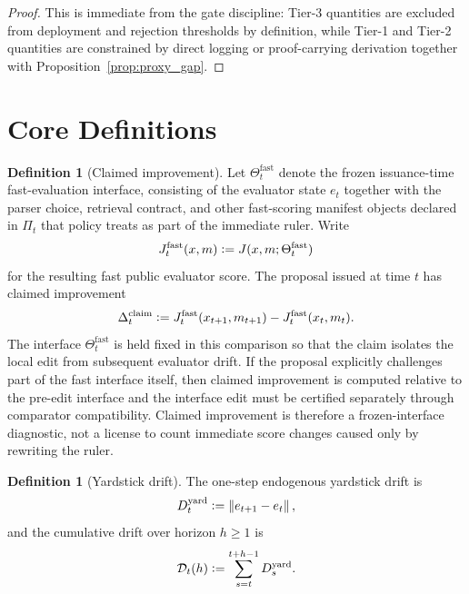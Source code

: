 \documentclass[11pt]{article}
\theoremstyle{definition}
\newtheorem{definition}[theorem]{Definition}
\newcommand{\1}{\mathbf{1}}
\newcommand{\norm}[1]{\left\lVert #1 \right\rVert}
\newcommand{\Defeq}{\vcentcolon=}
\begin{document}
\begin{proof}
This is immediate from the gate discipline: Tier-3 quantities are excluded from deployment and rejection thresholds by definition, while Tier-1 and Tier-2 quantities are constrained by direct logging or proof-carrying derivation together with Proposition~\ref{prop:proxy_gap}.
\end{proof}
\section{Core Definitions}
\begin{definition}[Claimed improvement]\label{def:claimed_improvement}
Let $\Theta_t^{\mathrm{fast}}$ denote the frozen issuance-time fast-evaluation interface, consisting of the evaluator state $e_t$ together with the parser choice, retrieval contract, and other fast-scoring manifest objects declared in $\Pi_t$ that policy treats as part of the immediate ruler. Write
\[
J_t^{\mathrm{fast}}(x,m)\Defeq J(x,m;\Theta_t^{\mathrm{fast}})
\]
for the resulting fast public evaluator score. The proposal issued at time $t$ has claimed improvement
\[
\Delta_t^{\mathrm{claim}}\Defeq J_t^{\mathrm{fast}}(x_{t+1},m_{t+1})-J_t^{\mathrm{fast}}(x_t,m_t).
\]
The interface $\Theta_t^{\mathrm{fast}}$ is held fixed in this comparison so that the claim isolates the local edit from subsequent evaluator drift. If the proposal explicitly challenges part of the fast interface itself, then claimed improvement is computed relative to the pre-edit interface and the interface edit must be certified separately through comparator compatibility. Claimed improvement is therefore a frozen-interface diagnostic, not a license to count immediate score changes caused only by rewriting the ruler.
\end{definition}

\begin{definition}[Yardstick drift]\label{def:yardstick_drift}
The one-step endogenous yardstick drift is
\[
D_t^{\mathrm{yard}}\Defeq \norm{e_{t+1}-e_t},
\]
and the cumulative drift over horizon $h\ge1$ is
\[
\mathcal D_t(h)\Defeq \sum_{s=t}^{t+h-1} D_s^{\mathrm{yard}}.
\]
\end{definition}
\end{document}
